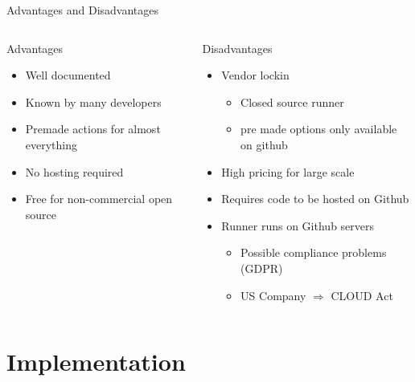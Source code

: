 \documentclass[compress,aspectratio=169]{beamer}
\begin{document}
	\begin{frame}{Advantages and Disadvantages}
    \begin{columns}
      \begin{column}{0.5\textwidth}
        \begin{block}{Advantages}
          \begin{itemize}
            \item Well documented
            \item Known by many developers
            \item Premade actions for almost everything
            \item No hosting required
            \item Free for non-commercial open source
          \end{itemize}
        \end{block}
      \end{column}
      \begin{column}{0.5\textwidth}
        \begin{block}{Disadvantages}
          \begin{itemize}
            \item Vendor lockin
              \begin{itemize}
                \item Closed source runner
                \item pre made options only available on github
              \end{itemize}
            \item High pricing for large scale
            \item Requires code to be hosted on Github
            \item Runner runs on Github servers
              \begin{itemize}
                \item Possible compliance problems (GDPR)
                \item US Company $\Rightarrow$ CLOUD Act
              \end{itemize}
          \end{itemize}
        \end{block}
      \end{column}
    \end{columns}
	\end{frame}

  \section{Implementation}
\end{document}
